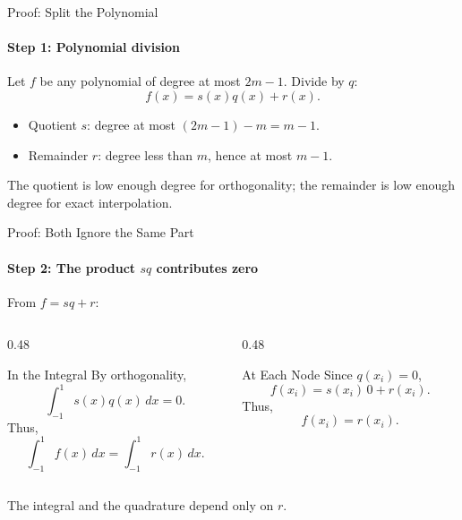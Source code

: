 \documentclass[10pt]{beamer}
\begin{document}
\begin{frame}{Proof: Split the Polynomial}
\framesubtitle{Step 1: Polynomial division}
Let $f$ be any polynomial of degree at most $2m-1$. Divide by $q$:
\[
    \boxed{f(x)=s(x)q(x)+r(x).}
\]
\begin{itemize}
    \item Quotient $s$: degree at most $(2m-1)-m=m-1$.
    \item Remainder $r$: degree less than $m$, hence at most $m-1$.
\end{itemize}

    \vfill

\begin{alertblock}{}
The quotient is low enough degree for orthogonality;
the remainder is low enough degree for exact interpolation.
\end{alertblock}
\end{frame}

\begin{frame}{Proof: Both Ignore the Same Part}
\framesubtitle{Step 2: The product $sq$ contributes zero}
From $f=sq+r$:
\begin{columns}[T]
\begin{column}{0.48\textwidth}
\begin{block}{In the Integral}
By orthogonality,
\[
    \int_{-1}^1 s(x)q(x)\,dx=0.
\]
Thus,
\[
    \int_{-1}^1 f(x)\,dx=\int_{-1}^1 r(x)\,dx.
\]
\end{block}
\end{column}
\begin{column}{0.48\textwidth}
\begin{block}{At Each Node}
Since $q(x_i)=0$,
\[
    f(x_i)=s(x_i)\,0+r(x_i).
\]
Thus,
\[
    f(x_i)=r(x_i).
\]
\end{block}
\end{column}
\end{columns}

\begin{alertblock}{}
The integral and the quadrature depend only on $r$.
\end{alertblock}
\end{frame}
\end{document}

